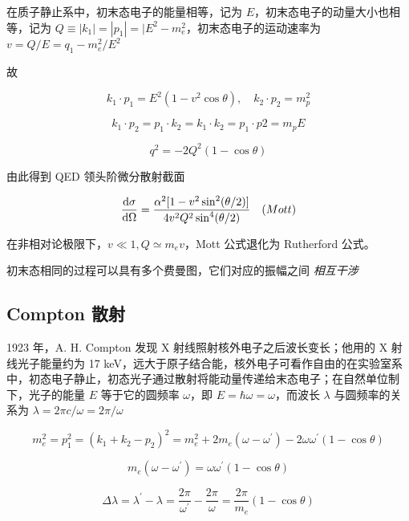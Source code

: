 在质子静止系中，初末态电子的能量相等，记为 $E$，初末态电子的动量大小也相等，记为 $Q \equiv |k_1| = |p_1| = |E^2-m^2_e$，初末态电子的运动速率为 $v = Q/E = q_1 - m^2_e/E^2$

故

\begin{equation}
    k_1 \cdot p_1 = E^2(1 - v^2 \cos\theta), \quad k_2 \cdot p_2 = m^2_p
\end{equation}

\begin{equation}
    k_1 \cdot p_2 = p_1 \cdot k_2 = k_1 \cdot k_2 = p_1 \cdot p2 = m_p E
\end{equation}

\begin{equation}
    q^2 = -2 Q^2(1 - \cos\theta)
\end{equation}

由此得到 QED 领头阶微分散射截面

\begin{equation}
    \frac{\mathop{}\!\mathrm{d}\sigma}{\mathop{}\!\mathrm{d}\Omega} = \frac{\alpha^2 [1-v^2\sin^2(\theta/2)]}{4 v^2 Q^2 \sin^4(\theta/2)} \quad (Mott)
\end{equation}

在非相对论极限下，$v \ll 1, Q \simeq m_e v$，Mott 公式退化为 Rutherford 公式。

初末态相同的过程可以具有多个费曼图，它们对应的振幅之间 \emph{相互干涉}

\subsection{Compton 散射}

1923 年，A. H. Compton 发现 X 射线照射核外电子之后波长变长；他用的 X 射线光子能量约为 17 keV，远大于原子结合能，核外电子可看作自由的在实验室系中，初态电子静止，初态光子通过散射将能动量传递给末态电子；在自然单位制下，光子的能量 $E$ 等于它的圆频率 $\omega$，即 $E = \hbar\omega = \omega$，而波长 $\lambda$ 与圆频率的关系为 $\lambda = 2\pi c/\omega = 2\pi/\omega$

\begin{equation}
    m^2_e = p^2_1 = (k_1+k_2-p_2)^2 = m_e^2 + 2 m_e (\omega-\omega^\prime) - 2\omega\omega^\prime(1-\cos\theta)
\end{equation}

\begin{equation}
    m_e(\omega-\omega^\prime) = \omega\omega^\prime(1-\cos\theta)
\end{equation}

\begin{equation}
    \Delta \lambda = \lambda^\prime - \lambda = \frac{2\pi}{\omega^\prime} - \frac{2\pi}{\omega} = \frac{2\pi}{m_e}(1-\cos\theta)
\end{equation}

